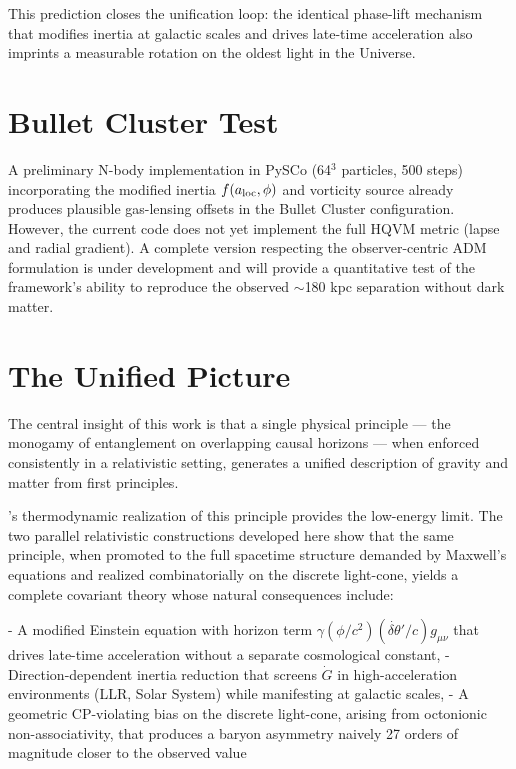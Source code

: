 \documentclass[12pt,a4paper]{article}
\begin{document}
This prediction closes the unification loop: the identical phase-lift mechanism that modifies inertia at galactic scales and drives late-time acceleration also imprints a measurable rotation on the oldest light in the Universe.


\section{Bullet Cluster Test}

A preliminary N-body implementation in PySCo (64$^3$ particles, 500 steps) incorporating the modified inertia $f(a_{\rm loc},\phi)$ and vorticity source already produces plausible gas-lensing offsets in the Bullet Cluster configuration. However, the current code does not yet implement the full HQVM metric (lapse and radial gradient). A complete version respecting the observer-centric ADM formulation is under development and will provide a quantitative test of the framework's ability to reproduce the observed $\sim$180 kpc separation without dark matter.

\section{The Unified Picture}

The central insight of this work is that a single physical principle — the monogamy of entanglement on overlapping causal horizons — when enforced consistently in a relativistic setting, generates a unified description of gravity and matter from first principles.

\citet{brodie2026}'s thermodynamic realization of this principle provides the low-energy limit. The two parallel relativistic constructions developed here show that the same principle, when promoted to the full spacetime structure demanded by Maxwell's equations and realized combinatorially on the discrete light-cone, yields a complete covariant theory whose natural consequences include:

- A modified Einstein equation with horizon term $\gamma(\phi/c^2)(\dot{\delta\theta}'/c) g_{\mu\nu}$ that drives late-time acceleration without a separate cosmological constant,
- Direction-dependent inertia reduction that screens $\dot{G}$ in high-acceleration environments (LLR, Solar System) while manifesting at galactic scales,
- A geometric CP-violating bias on the discrete light-cone, arising from octonionic non-associativity, that produces a baryon asymmetry naively 27 orders of magnitude closer to the observed value
\end{document}
